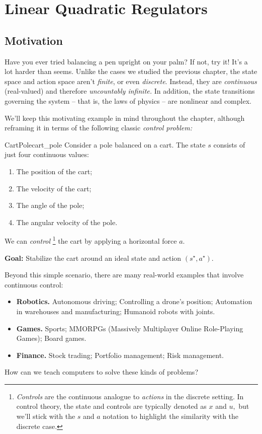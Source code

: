 \documentclass[../main/main]{subfiles}
\begin{document}
    
\chapter[LQR]{Linear Quadratic Regulators}


\section{Motivation}

Have you ever tried balancing a pen upright on your palm?
If not, try it! It's a lot harder than seems.
Unlike the cases we studied the previous chapter,
the state space and action space aren't \emph{finite}, or even \emph{discrete}.
Instead, they are \emph{continuous} (real-valued) and therefore \emph{uncountably infinite.}
In addition, the state transitions governing the system -- that is, the laws of physics --
are nonlinear and complex.

We'll keep this motivating example in mind throughout the chapter,
although reframing it in terms of the following classic \emph{control problem:}

\begin{example}{CartPole}{cart_pole}
    Consider a pole balanced on a cart.
    The state $s$ consists of just four continuous values:

    \begin{enumerate}
        \item The position of the cart;
        \item The velocity of the cart;
        \item The angle of the pole;
        \item The angular velocity of the pole.
    \end{enumerate}

    \noindent
    We can \emph{control}
    \footnote{\emph{Controls} are the continuous analogue to \emph{actions} in the discrete setting. In control theory, the state and controls are typically denoted as
    $x$ and $u,$ but we'll stick with the $s$ and $a$ notation to highlight the
    similarity with the discrete case.}
    the cart by applying a horizontal force $a$.

    \noindent
    \textbf{Goal:} Stabilize the cart around an ideal state and action $(s^\star, a^\star)$.
\end{example}

Beyond this simple scenario, there are many real-world examples that involve continuous control:
\begin{itemize}
    \item \textbf{Robotics.} Autonomous driving; Controlling a drone's position; Automation in warehouses and manufacturing; Humanoid robots with joints.
    \item \textbf{Games.} Sports; MMORPGs (Massively Multiplayer Online Role-Playing Games); Board games.
    \item \textbf{Finance.} Stock trading; Portfolio management; Risk management.
\end{itemize}
How can we teach computers to solve these kinds of problems?
\end{document}
